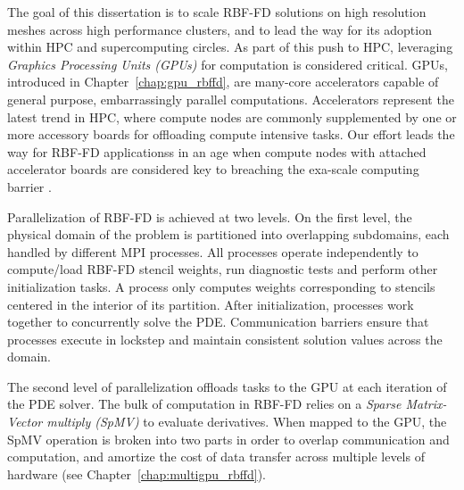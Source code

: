 \documentclass[11pt]{report}
\begin{document}
The goal of this dissertation is to scale RBF-FD solutions on high resolution meshes across high performance clusters, and to lead the way for its adoption within HPC and supercomputing circles. As part of this push to HPC, leveraging \emph{Graphics Processing Units (GPUs)} for computation is considered critical. GPUs, introduced in Chapter~\ref{chap:gpu_rbffd}, are many-core accelerators capable of general purpose, embarrassingly parallel computations. Accelerators represent the latest trend in HPC, where compute nodes are commonly supplemented by one or more accessory boards for offloading compute intensive tasks. Our effort leads the way for RBF-FD applicationss in an age when compute nodes with attached accelerator boards are considered key to breaching the exa-scale computing barrier \cite{GPUandExascale2011}. 

Parallelization of RBF-FD is achieved at two levels. On the first level, the
physical domain of the problem is partitioned
into overlapping subdomains, each handled by different MPI processes. All processes
operate independently to compute/load RBF-FD stencil weights, run diagnostic
tests and perform other initialization tasks. A process only computes weights
corresponding to stencils centered in the interior of its partition. After
initialization, processes work together to concurrently solve the PDE. Communication
barriers ensure that processes execute in lockstep and maintain consistent
solution values across the domain.  

The second level of
parallelization offloads tasks to the GPU at each iteration of the PDE solver. The bulk of computation in RBF-FD relies on a \emph{Sparse Matrix-Vector multiply (SpMV)} to evaluate derivatives. When mapped to the GPU, the SpMV operation is broken into two parts in order to overlap communication and computation, and amortize the cost of data transfer across multiple levels of hardware (see Chapter~\ref{chap:multigpu_rbffd}). 

\end{document}
